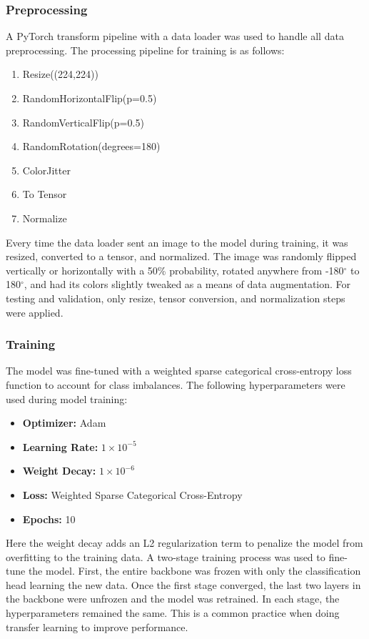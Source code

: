 \documentclass[conference]{IEEEtran}
\begin{document}
\subsubsection{\textbf{Preprocessing}}
A PyTorch transform pipeline with a data loader was used to handle all data preprocessing. The processing pipeline for training is as follows:
\begin{enumerate}
    \item Resize((224,224))
    \item RandomHorizontalFlip(p=0.5)
    \item RandomVerticalFlip(p=0.5)
    \item RandomRotation(degrees=180)
    \item ColorJitter
    \item To Tensor
    \item Normalize
\end{enumerate}
Every time the data loader sent an image to the model during training, it was resized, converted to a tensor, and normalized. The image was randomly flipped vertically or horizontally with a 50\% probability, rotated anywhere from -180$^\circ$ to 180$^\circ$, and had its colors slightly tweaked as a means of data augmentation. For testing and validation, only resize, tensor conversion, and normalization steps were applied.

\subsubsection{\textbf{Training}}
The model was fine-tuned with a weighted sparse categorical cross-entropy loss function to account for class imbalances. The following hyperparameters were used during model training:
\begin{itemize}
    \item \textbf{Optimizer: }Adam
    \item \textbf{Learning Rate: } $1\times10^{-5}$
    \item \textbf{Weight Decay: } $1\times10^{-6}$
    \item \textbf{Loss: } Weighted Sparse Categorical Cross-Entropy
    \item \textbf{Epochs: } 10
\end{itemize}
Here the weight decay adds an L2 regularization term to penalize the model from overfitting to the training data. A two-stage training process was used to fine-tune the model. First, the entire backbone was frozen with only the classification head learning the new data. Once the first stage converged, the last two layers in the backbone were unfrozen and the model was retrained. In each stage, the hyperparameters remained the same. This is a common practice when doing transfer learning to improve performance.
\end{document}
